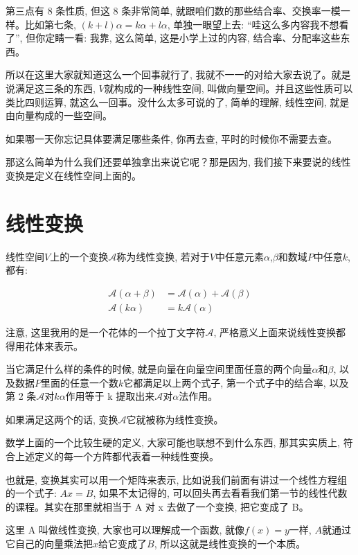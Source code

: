 第三点有 8 条性质, 但这 8 条非常简单, 就跟咱们数的那些结合率、交换率一模一样。比如第七条, $(k+ l)\alpha =  k\alpha+ l\alpha$, 单独一眼望上去: “哇这么多内容我不想看了”, 但你定睛一看: 我靠, 这么简单, 这是小学上过的内容, 结合率、分配率这些东西。

所以在这里大家就知道这么一个回事就行了, 我就不一一的对给大家去说了。就是说满足这三条的东西, $V$就构成的一种线性空间, 叫做向量空间。并且这些性质可以类比四则运算, 就这么一回事。没什么太多可说的了, 简单的理解, 线性空间, 就是由向量构成的一些空间。

如果哪一天你忘记具体要满足哪些条件, 你再去查, 平时的时候你不需要去查。

那这么简单为什么我们还要单独拿出来说它呢？那是因为, 我们接下来要说的线性变换是定义在线性空间上面的。

\section{线性变换}

线性空间$V$上的一个变换$\mathcal{A}$称为线性变换, 若对于$V$中任意元素$\alpha$,$\beta$和数域$P$中任意$k$, 都有: 

\begin{align*}
  \mathcal{A}(\alpha+\beta) & = \mathcal{A}(\alpha) + \mathcal{A}(\beta) \\
  \mathcal{A}( k\alpha) & =  k\mathcal{A}(\alpha)
\end{align*}

注意, 这里我用的是一个花体的一个拉丁文字符$\mathcal{A}$, 严格意义上面来说线性变换都得用花体来表示。

当它满足什么样的条件的时候, 就是向量在向量空间里面任意的两个向量$\alpha$和$\beta$, 以及数据$P$里面的任意一个数$k$它都满足以上两个式子, 第一个式子中的结合率, 以及第 2 条$\mathcal{A}$对$k\alpha$作用等于 k 提取出来$\mathcal{A}$对$\alpha$法作用。

如果满足这两个的话, 变换$\mathcal{A}$它就被称为线性变换。

数学上面的一个比较生硬的定义, 大家可能也联想不到什么东西, 那其实实质上, 符合上述定义的每一个方阵都代表着一种线性变换。

也就是, 变换其实可以用一个矩阵来表示, 比如说我们前面有讲过一个线性方程组的一个式子: $Ax = B$, 如果不太记得的, 可以回头再去看看我们第一节的线性代数的课程。其实在那里就相当于 A 对 x 去做了一个变换, 把它变成了 B。

这里 A 叫做线性变换, 大家也可以理解成一个函数, 就像$f(x)=y$一样, $A$就通过它自己的向量乘法把$x$给它变成了$B$, 所以这就是线性变换的一个本质。


